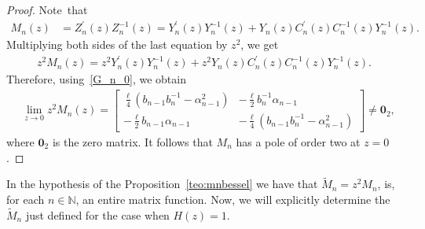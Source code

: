 \documentclass[12pt]{amsart}
\newtheorem{corollary}{Corollary}[section]
\begin{document}
\begin{proof}
Note~that
\begin{align*}
M_n(z) &= Z_n^\prime (z)Z_n^{-1}(z) = Y_n^\prime (z)Y_n^{-1}(z)+Y_n(z)C_n^\prime(z)C_n^{-1}(z)Y_n^{-1}(z). 
\end{align*}
Multiplying both sides of the last equation by \(z^2 \), we get 
\begin{align*}
z^2M_n(z)=z^2Y_n^\prime(z)Y_n^{-1}(z)+z^2Y_n(z)C_n^\prime(z)C_n^{-1}(z)Y_n^{-1}(z).
\end{align*}
Therefore, using~\eqref{G_n_0},
we obtain 
\begin{align*}
& \lim_{z \to 0}z^2M_n(z)={\begin{bmatrix}
\frac{ \ell }{4}(b_{n-1}b_n^{-1}-\alpha_{n-1}^2) & -\frac{ \ell }{2}b_n^{-1}\alpha_{n-1}\\
 -\frac{ \ell }{2}b_{n-1}\alpha_{n-1} & -\frac{ \ell }{4}( b_{n-1}b_n^{-1}-\alpha_{n-1}^2)
\end{bmatrix}}\neq \mathbf{0}_{2},
\end{align*}
where \( \mathbf{0}_{2} \) is the zero matrix.
It follows that \( M_n \) has a pole of order two at \( z=0 \).
\end{proof}


In the hypothesis of the Proposition~\ref{teo:mnbessel} we have that
\( \widetilde{M}_n=z^2 M_n \), 
is, for each \( n \in \mathbb N \), an entire matrix function.
Now, we will explicitly determine the \( \widetilde M_n \) just defined for the case when \( H (z) = 1\).
\end{document}
